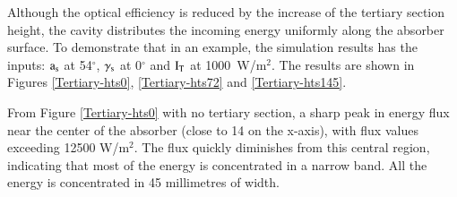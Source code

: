 
Although the optical efficiency is reduced by the increase of the tertiary section height, the cavity distributes the incoming energy uniformly along the absorber surface. To demonstrate that in an example, the simulation results has the inputs: ${\rm{a_s}}$ at 54$^{\circ}$, $\gamma_{\rm{s}}$ at 0$^{\circ}$ and $\rm I_T$ at 1000~W/m$^2$. The results are shown in Figures \ref{Tertiary-hts0}, \ref{Tertiary-hts72} and \ref{Tertiary-hts145}. 

\newpage
From Figure \ref{Tertiary-hts0} with no tertiary section, a sharp peak in energy flux near the center of the absorber (close to 14 on the x-axis), with flux values exceeding 12500 W/m$^2$. The flux quickly diminishes from this central region, indicating that most of the energy is concentrated in a narrow band. All the energy is concentrated in 45 millimetres of width. 

